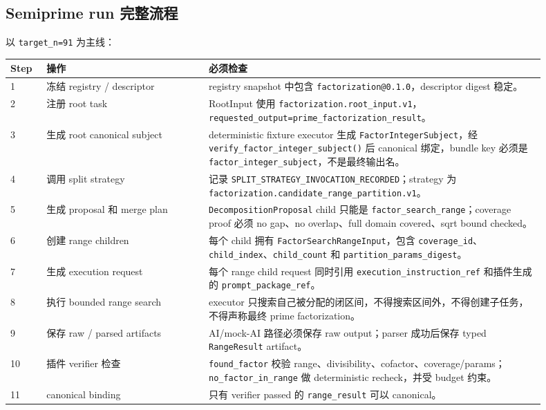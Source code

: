 \documentclass[11pt]{ctexart}
\begin{document}
\subsection{Semiprime run 完整流程}

以 \texttt{target\_n=91} 为主线：

\begin{longtable}{p{0.06\linewidth}p{0.27\linewidth}p{0.57\linewidth}}
\toprule
Step & 操作 & 必须检查 \\
\midrule
1 & 冻结 registry / descriptor & registry snapshot 中包含 \texttt{factorization@0.1.0}，descriptor digest 稳定。 \\
2 & 注册 root task & RootInput 使用 \texttt{factorization.root\_input.v1}，\texttt{requested\_output=prime\_factorization\_result}。 \\
3 & 生成 root canonical subject & deterministic fixture executor 生成 \texttt{FactorIntegerSubject}，经 \texttt{verify\_factor\_integer\_subject()} 后 canonical 绑定，bundle key 必须是 \texttt{factor\_integer\_subject}，不是最终输出名。 \\
4 & 调用 split strategy & 记录 \texttt{SPLIT\_STRATEGY\_INVOCATION\_RECORDED}；strategy 为 \texttt{factorization.candidate\_range\_partition.v1}。 \\
5 & 生成 proposal 和 merge plan & \texttt{DecompositionProposal} child 只能是 \texttt{factor\_search\_range}；coverage proof 必须 no gap、no overlap、full domain covered、sqrt bound checked。 \\
6 & 创建 range children & 每个 child 拥有 \texttt{FactorSearchRangeInput}，包含 \texttt{coverage\_id}、\texttt{child\_index}、\texttt{child\_count} 和 \texttt{partition\_params\_digest}。 \\
7 & 生成 execution request & 每个 range child request 同时引用 \texttt{execution\_instruction\_ref} 和插件生成的 \texttt{prompt\_package\_ref}。 \\
8 & 执行 bounded range search & executor 只搜索自己被分配的闭区间，不得搜索区间外，不得创建子任务，不得声称最终 prime factorization。 \\
9 & 保存 raw / parsed artifacts & AI/mock-AI 路径必须保存 raw output；parser 成功后保存 typed \texttt{RangeResult} artifact。 \\
10 & 插件 verifier 检查 & \texttt{found\_factor} 校验 range、divisibility、cofactor、coverage/params；\texttt{no\_factor\_in\_range} 做 deterministic recheck，并受 budget 约束。 \\
11 & canonical binding & 只有 verifier passed 的 \texttt{range\_result} 可以 canonical。 \\

\end{longtable}
\end{document}
